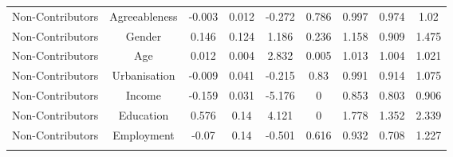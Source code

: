 \begin{table}[!htbp]
\begin{tabular}{@{\extracolsep{5pt}} ccccccccc}
Non-Contributors & Agreeableness & -0.003 & 0.012 & -0.272 & 0.786 & 0.997 & 0.974 & 1.02 \\ 
Non-Contributors & Gender & 0.146 & 0.124 & 1.186 & 0.236 & 1.158 & 0.909 & 1.475 \\ 
Non-Contributors & Age & 0.012 & 0.004 & 2.832 & 0.005 & 1.013 & 1.004 & 1.021 \\ 
Non-Contributors & Urbanisation & -0.009 & 0.041 & -0.215 & 0.83 & 0.991 & 0.914 & 1.075 \\ 
Non-Contributors & Income & -0.159 & 0.031 & -5.176 & 0 & 0.853 & 0.803 & 0.906 \\ 
Non-Contributors & Education & 0.576 & 0.14 & 4.121 & 0 & 1.778 & 1.352 & 2.339 \\ 
Non-Contributors & Employment & -0.07 & 0.14 & -0.501 & 0.616 & 0.932 & 0.708 & 1.227 \\ 
\hline \\[-1.8ex] 
\end{tabular} 
\end{table} 
